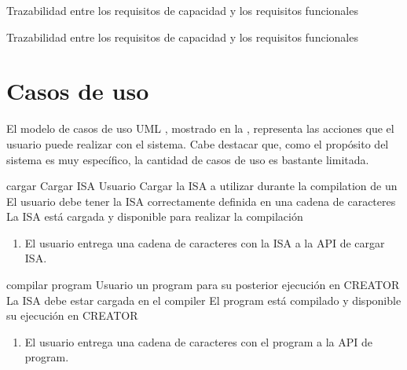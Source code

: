     {Trazabilidad entre los requisitos de capacidad y los requisitos funcionales}

    {Trazabilidad entre los requisitos de capacidad y los requisitos funcionales}

\FloatBarrier

\section{Casos de uso}\label{sec:usecases}

El modelo de casos de uso UML \parencite{UMLSpec}, mostrado en la
, representa las acciones que el usuario puede realizar con
el sistema. Cabe destacar que, como el propósito del sistema es muy específico,
la cantidad de casos de uso es bastante limitada.


\printuctemplate


\begin{useCase}{cargar}
    {Cargar \gls{ISA}} %
    {Usuario} %
    {Cargar la \gls{ISA} a utilizar durante la \gls{compilation} de un } %
    {El usuario debe tener la \gls{ISA} correctamente definida en una cadena de caracteres} %
    {La \gls{ISA} está cargada y disponible para realizar la compilación} %
    \begin{enumerate}[leftmargin=*, topsep=0pt, noitemsep]
        \item El usuario entrega una cadena de caracteres con la
        \gls{ISA} a la \gls{API} de cargar \gls{ISA}.
    \end{enumerate}
\end{useCase}

\begin{useCase}{compilar}
    { \gls{program}} %
    {Usuario} %
    { un \gls{program} para su posterior ejecución en CREATOR} %
    {La \gls{ISA} debe estar cargada en el \gls{compiler}} %
    {El \gls{program} está compilado y disponible su ejecución en CREATOR} %
    \begin{enumerate}[leftmargin=*, topsep=0pt, noitemsep]
        \item El usuario entrega una cadena de caracteres con el \gls{program}
        a la \gls{API} de  \gls{program}.
    \end{enumerate}
\end{useCase}
